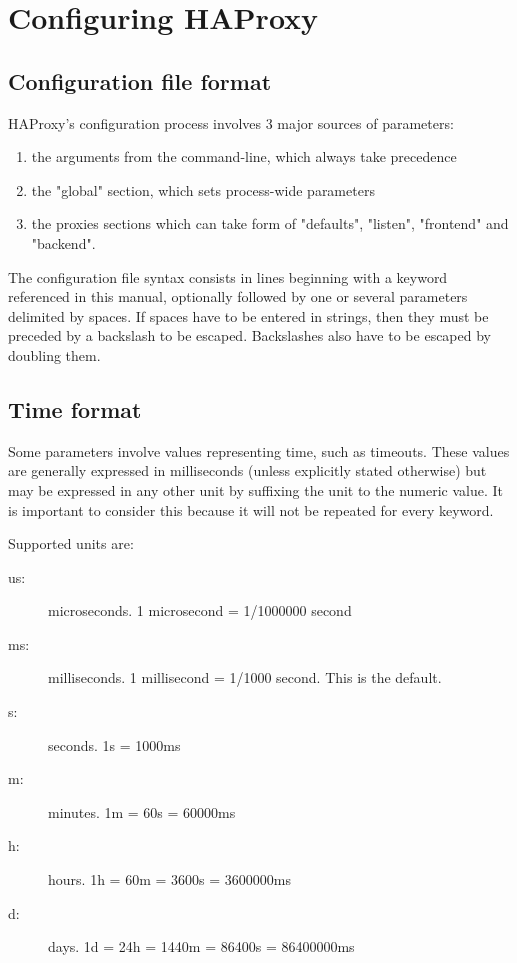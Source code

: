 \chapter{Configuring HAProxy}
\label{chap:configuring_haproxy}

\section{Configuration file format}
\label{sec:config_format}

HAProxy's configuration process involves 3 major sources of parameters:

\begin{enumerate}
\item the arguments from the command-line, which always take precedence
\item the "global" section, which sets process-wide parameters
\item the proxies sections which can take form of "defaults", "listen",
    "frontend" and "backend".
\end{enumerate}

The configuration file syntax consists in lines beginning with a keyword
referenced in this manual, optionally followed by one or several parameters
delimited by spaces. If spaces have to be entered in strings, then they must be
preceded by a backslash \chr{\bslash} to be escaped. Backslashes also have to be
escaped by doubling them.

\section{Time format}
\label{sec:time_format}

Some parameters involve values representing time, such as timeouts. These
values are generally expressed in milliseconds (unless explicitly stated
otherwise) but may be expressed in any other unit by suffixing the unit to the
numeric value. It is important to consider this because it will not be repeated
for every keyword.


Supported units are:

\begin{description}
\item[us:] microseconds. 1 microsecond = 1/1000000 second
\item[ms:] milliseconds. 1 millisecond = 1/1000 second. This is the default.
\item[s:]  seconds. 1s = 1000ms
\item[m:]  minutes. 1m = 60s = 60000ms
\item[h:]  hours.   1h = 60m = 3600s = 3600000ms
\item[d:]  days.    1d = 24h = 1440m = 86400s = 86400000ms
\end{description}


